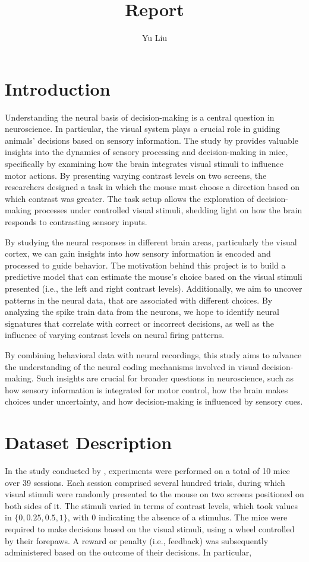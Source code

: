 \documentclass[12pt]{article}
\title{Report}
\author{Yu Liu}
\date{}
\begin{document}
\maketitle

\section{Introduction}
Understanding the neural basis of decision-making is a central question in neuroscience. In particular, the visual system plays a crucial role in guiding animals' decisions based on sensory information. The study by \cite{steinmetz2019distributed} provides valuable insights into the dynamics of sensory processing and decision-making in mice, specifically by examining how the brain integrates visual stimuli to influence motor actions. By presenting varying contrast levels on two screens, the researchers designed a task in which the mouse must choose a direction based on which contrast was greater. The task setup allows the exploration of decision-making processes under controlled visual stimuli, shedding light on how the brain responds to contrasting sensory inputs.

By studying the neural responses in different brain areas, particularly the visual cortex, we can gain insights into how sensory information is encoded and processed to guide behavior. The motivation behind this project is to build a predictive model that can estimate the mouse's choice based on the visual stimuli presented (i.e., the left and right contrast levels). Additionally, we aim to uncover patterns in the neural data, that are associated with different choices. By analyzing the spike train data from the neurons, we hope to identify neural signatures that correlate with correct or incorrect decisions, as well as the influence of varying contrast levels on neural firing patterns.

By combining behavioral data with neural recordings, this study aims to advance the understanding of the neural coding mechanisms involved in visual decision-making. Such insights are crucial for broader questions in neuroscience, such as how sensory information is integrated for motor control, how the brain makes choices under uncertainty, and how decision-making is influenced by sensory cues.

\section{Dataset Description}
In the study conducted by \cite{steinmetz2019distributed}, experiments were performed on a total of 10 mice over 39 sessions. Each session comprised several hundred trials, during which visual stimuli were randomly presented to the mouse on two screens positioned on both sides of it. The stimuli varied in terms of contrast levels, which took values in $\{0, 0.25, 0.5, 1\}$, with $0$ indicating the absence of a stimulus. The mice were required to make decisions based on the visual stimuli, using a wheel controlled by their forepaws. A reward or penalty (i.e., feedback) was subsequently administered based on the outcome of their decisions. In particular,
\end{document}
